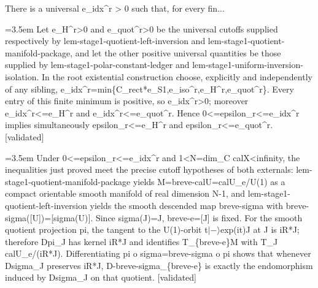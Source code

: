 \documentclass{article}
\newcommand{\step}[1]{\par\noindent\hangindent=3.5em\hangafter=1%
  \makebox[3.5em][l]{\textbf{#1.}}}
\newcommand{\steptag}[1]{\hfill{\small\textsf{[#1]}}}
\begin{document}
\begin{proofbox}{There is a universal e\_idx\textasciicircum{}r > 0 such that, for every fin...}
\step{1.2.1} Let e\_H\textasciicircum{}r>0 and e\_quot\textasciicircum{}r>0 be the universal cutoffs supplied respectively by lem-stage1-quotient-left-inversion and lem-stage1-quotient-manifold-package, and let the other positive universal quantities be those supplied by lem-stage1-polar-constant-ledger and lem-stage1-uniform-inversion-isolation. In the root existential construction choose, explicitly and independently of any sibling, e\_idx\textasciicircum{}r=min\{C\_rect*e\_S1,e\_iso\textasciicircum{}r,e\_H\textasciicircum{}r,e\_quot\textasciicircum{}r\}. Every entry of this finite minimum is positive, so e\_idx\textasciicircum{}r>0; moreover e\_idx\textasciicircum{}r<=e\_H\textasciicircum{}r and e\_idx\textasciicircum{}r<=e\_quot\textasciicircum{}r. Hence 0<=epsilon\_r<=e\_idx\textasciicircum{}r implies simultaneously epsilon\_r<=e\_H\textasciicircum{}r and epsilon\_r<=e\_quot\textasciicircum{}r. \steptag{validated} \\[4pt]
\step{1.2.2} Under 0<=epsilon\_r<=e\_idx\textasciicircum{}r and 1<N=dim\_C calX<infinity, the inequalities just proved meet the precise cutoff hypotheses of both externals: lem-stage1-quotient-manifold-package yields M=breve-calU=calU\_e/U(1) as a compact orientable smooth manifold of real dimension N-1, and lem-stage1-quotient-left-inversion yields the smooth descended map breve-sigma with breve-sigma([U])=[sigma(U)]. Since sigma(J)=J, breve-e=[J] is fixed. For the smooth quotient projection pi, the tangent to the U(1)-orbit t$|-\rangle$exp(it)J at J is iR*J; therefore Dpi\_J has kernel iR*J and identifies T\_\{breve-e\}M with T\_J calU\_e/(iR*J). Differentiating pi o sigma=breve-sigma o pi shows that whenever Dsigma\_J preserves iR*J, D-breve-sigma\_\{breve-e\} is exactly the endomorphism induced by Dsigma\_J on that quotient. \steptag{validated} \\[6pt]

\end{proofbox}
\end{document}
